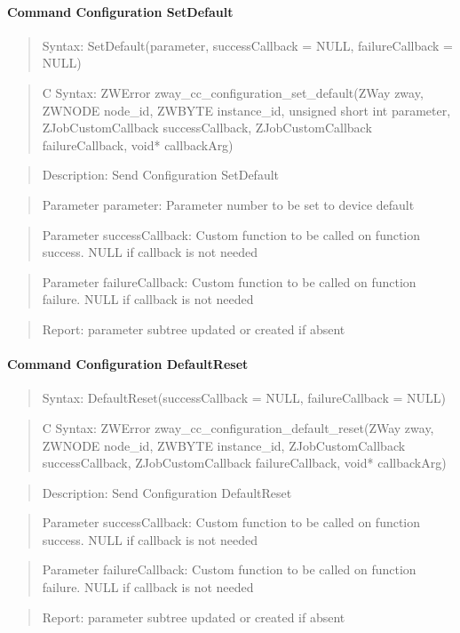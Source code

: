 \paragraph{Command Configuration SetDefault}
\begin{quote}Syntax: SetDefault(parameter, successCallback = NULL, failureCallback = NULL)\end{quote}
\begin{quote}C Syntax: ZWError zway\_cc\_configuration\_set\_default(ZWay zway, ZWNODE node\_id, ZWBYTE instance\_id, unsigned short int parameter, ZJobCustomCallback successCallback, ZJobCustomCallback failureCallback, void* callbackArg)\end{quote}
\begin{quote}Description: Send Configuration SetDefault\end{quote}
\begin{quote}Parameter parameter: Parameter number to be set to device default\end{quote}
\begin{quote}Parameter successCallback: Custom function to be called on function success. NULL if callback is not needed\end{quote}
\begin{quote}Parameter failureCallback: Custom function to be called on function failure. NULL if callback is not needed\end{quote}
\begin{quote}Report: parameter subtree updated or created if absent\end{quote}

\paragraph{Command Configuration DefaultReset}
\begin{quote}Syntax: DefaultReset(successCallback = NULL, failureCallback = NULL)\end{quote}
\begin{quote}C Syntax: ZWError zway\_cc\_configuration\_default\_reset(ZWay zway, ZWNODE node\_id, ZWBYTE instance\_id, ZJobCustomCallback successCallback, ZJobCustomCallback failureCallback, void* callbackArg)\end{quote}
\begin{quote}Description: Send Configuration DefaultReset\end{quote}
\begin{quote}Parameter successCallback: Custom function to be called on function success. NULL if callback is not needed\end{quote}
\begin{quote}Parameter failureCallback: Custom function to be called on function failure. NULL if callback is not needed\end{quote}
\begin{quote}Report: parameter subtree updated or created if absent\end{quote}



